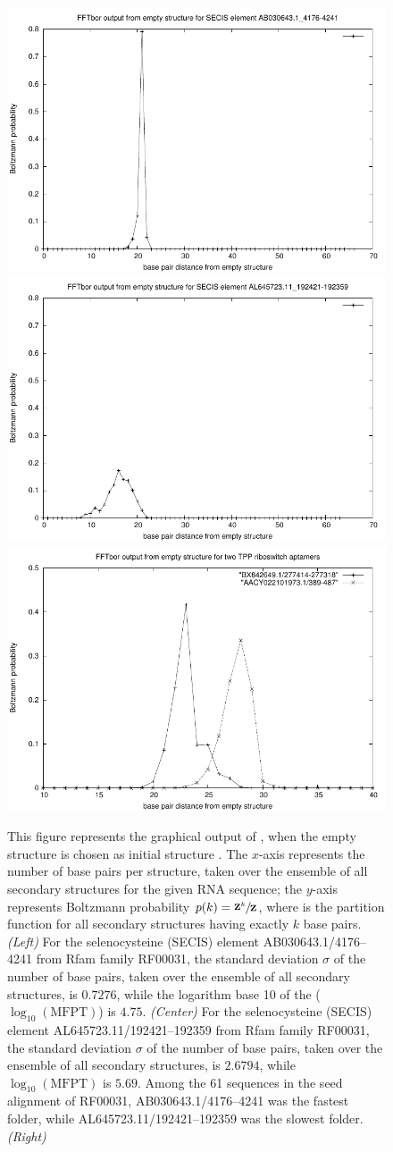 \begin{figure}[!ht]
\centering
\includegraphics[width=.3\textwidth]{Figures/FFTbor/AB030643_1_4176-4241.pdf}
\includegraphics[width=.3\textwidth]{Figures/FFTbor/AL645723_11_192421-192359.pdf}
\includegraphics[width=.3\textwidth]{Figures/FFTbor/FFTborOutputFromEmptyStrForTPPriboswitches.pdf}
\caption[Example of the graphical output of \fftbor, when the empty structure is chosen as initial structure \strSt]{This figure represents the
graphical output of \fftbor, when the empty structure is chosen as
initial structure \strSt.
The $x$-axis represents the number of base pairs per structure,
taken over the ensemble of all secondary structures for the given RNA
sequence; the $y$-axis represents Boltzmann probability
$p(k) = \sfrac{{\bf Z}^{k}_{}}{{\bf Z}^{}_{}}$,
where \fullZ is the partition function for all secondary structures
having exactly $k$ base pairs.
{\em (Left)}
For the selenocysteine (SECIS) element AB030643.1/4176--4241 from Rfam family
RF00031, the standard deviation $\sigma$ of the number of base pairs,
taken over the ensemble of all secondary structures, is
$0.7276$, while the logarithm base 10 of the \mfpt ($\log_{10}(\text{MFPT})$)
is $4.75$.
{\em (Center)}
For the selenocysteine (SECIS) element
AL645723.11/192421--192359 from Rfam family
RF00031, the standard deviation $\sigma$ of the number of base pairs,
taken over the ensemble of all secondary structures, is
$2.6794$, while $\log_{10}(\text{MFPT})$ is $5.69$.
Among the 61 sequences in the seed alignment of RF00031,
AB030643.1/4176--4241 was the fastest folder, while
AL645723.11/192421--192359 was the slowest folder.
{\em (Right)}
}
\end{figure}
